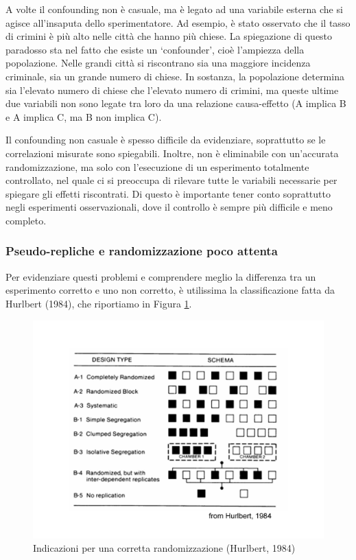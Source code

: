 \documentclass[a4paper,12pt,oneside]{book}
\begin{document}
A volte il confounding non è casuale, ma è legato ad una variabile esterna che si agisce all'insaputa dello sperimentatore. Ad esempio, è stato osservato che il tasso di crimini è più alto nelle città che hanno più chiese. La spiegazione di questo paradosso sta nel fatto che esiste un `confounder', cioè l'ampiezza della popolazione. Nelle grandi città si riscontrano sia una maggiore incidenza criminale, sia un grande numero di chiese. In sostanza, la popolazione determina sia l'elevato numero di chiese che l'elevato numero di crimini, ma queste ultime due variabili non sono legate tra loro da una relazione causa-effetto (A implica B e A implica C, ma B non implica C).

Il confounding non casuale è spesso difficile da evidenziare, soprattutto se le correlazioni misurate sono spiegabili. Inoltre, non è eliminabile con un'accurata randomizzazione, ma solo con l'esecuzione di un esperimento totalmente controllato, nel quale ci si preoccupa di rilevare tutte le variabili necessarie per spiegare gli effetti riscontrati. Di questo è importante tener conto soprattutto negli esperimenti osservazionali, dove il controllo è sempre più difficile e meno completo.

\hypertarget{pseudo-repliche-e-randomizzazione-poco-attenta}{%
\subsubsection{Pseudo-repliche e randomizzazione poco attenta}\label{pseudo-repliche-e-randomizzazione-poco-attenta}}

Per evidenziare questi problemi e comprendere meglio la differenza tra un esperimento corretto e uno non corretto, è utilissima la classificazione fatta da Hurlbert (1984), che riportiamo in Figura \ref{fig:figName23}.

\begin{figure}

{\centering \includegraphics[width=0.9\linewidth]{_images/Randomisation} 

}

\caption{Indicazioni per una corretta randomizzazione (Hurlbert, 1984)}\label{fig:figName23}
\end{figure}
\end{document}

